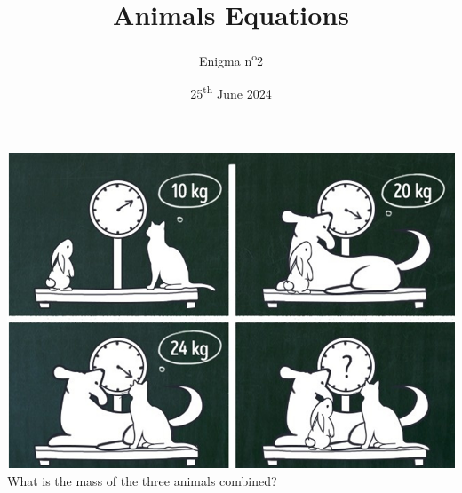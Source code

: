 \documentclass[a4paper, top=10mm]{article}
\title{\textbf{\huge{Animals Equations}}}
\author{Enigma n\textsuperscript{o}2}
\date{25\textsuperscript{th} June 2024}
\begin{document}
	\maketitle
	
	\vspace{1cm}
	
	\begin{center}
		\includegraphics[width=\linewidth]{02image.png}\\
		What is the mass of the three animals combined?
	\end{center}
	
	
\end{document}
